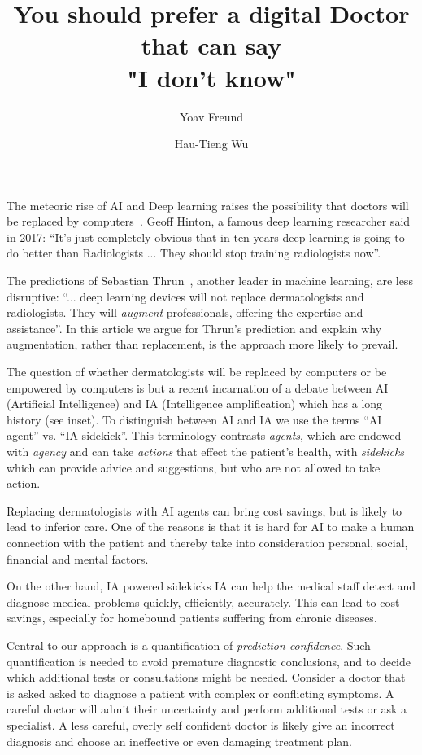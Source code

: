 \documentclass[11pt]{pnas-new}
\author[1]{Yoav Freund}
\author[2]{Hau-Tieng Wu}
\affil[1]{UCSD, Computer Science, San Diego, 92093, United States}
\affil[2]{Duke, Mathematics and Statistical Science, Durham, 27708, USA}
\title{You should prefer a digital Doctor that can say\\ "I don't know"}
\newlength{\strutheight}
\begin{document}
\settoheight{\strutheight}{\strut}

 
\maketitle


The meteoric rise of AI and Deep learning raises the possibility that
doctors will be replaced by computers~\cite{Mukherjee2017}. Geoff Hinton,
a famous deep learning researcher said in 2017: ``It's just completely
obvious that in ten years deep learning is going to do better than
Radiologists ... They should stop training radiologists now''.

The predictions of Sebastian
Thrun~\cite{Mukherjee2017,esteva2017dermatologist}, another leader in
machine learning, are less disruptive: ``... deep learning devices
will not replace dermatologists and radiologists. They will {\em
  augment} professionals, offering the expertise and assistance''. In
this article we argue for Thrun's prediction and explain why
augmentation, rather than replacement, is the approach more likely to
prevail.

 The question of whether dermatologists will be
replaced by computers or be empowered by computers is but a recent
incarnation of a debate between AI (Artificial Intelligence) and IA
(Intelligence amplification) which has a long history (see inset). To
distinguish between AI and IA we use the terms ``AI agent'' vs. ``IA
sidekick''. This terminology contrasts {\em agents}, which are endowed
with {\em agency} and can take {\em actions} that effect the patient's
health, with {\em sidekicks} which can provide advice and suggestions,
but who are not allowed to take action.

Replacing dermatologists with AI agents can bring cost savings,
but is likely to lead to inferior care. One of the reasons is that it
is hard for AI to make a human connection with the patient and thereby
take into consideration personal, social, financial and mental factors.

On the other hand, IA powered sidekicks IA can help the medical staff
detect and diagnose medical problems quickly, efficiently,
accurately. This can lead to cost savings, especially for homebound
patients suffering from chronic diseases.

Central to our approach is a quantification of {\em prediction
  confidence}. Such quantification is needed to avoid premature
diagnostic conclusions, and to decide which additional tests or
consultations might be needed. Consider a doctor that is asked asked
to diagnose a patient with complex or conflicting symptoms. A careful
doctor will admit their uncertainty and perform additional tests or
ask a specialist. A less careful, overly self confident doctor is
likely give an incorrect diagnosis and choose an ineffective or even damaging
treatment plan.
\end{document}
